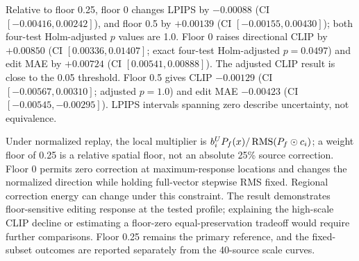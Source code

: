 Relative to floor 0.25, floor 0 changes LPIPS by $-0.00088$ (CI $[-0.00416,0.00242]$), and floor 0.5 by $+0.00139$ (CI $[-0.00155,0.00430]$); both four-test Holm-adjusted $p$ values are 1.0. Floor 0 raises directional CLIP by $+0.00850$ (CI $[0.00336,0.01407]$; exact four-test Holm-adjusted $p=0.0497$) and edit MAE by $+0.00724$ (CI $[0.00541,0.00888]$). The adjusted CLIP result is close to the 0.05 threshold. Floor 0.5 gives CLIP $-0.00129$ (CI $[-0.00567,0.00310]$; adjusted $p=1.0$) and edit MAE $-0.00423$ (CI $[-0.00545,-0.00295]$). LPIPS intervals spanning zero describe uncertainty, not equivalence.

Under normalized replay, the local multiplier is $b_i^U P_f(x)/\operatorname{RMS}(P_f\odot c_i)$; a weight floor of 0.25 is a relative spatial floor, not an absolute 25\% source correction. Floor 0 permits zero correction at maximum-response locations and changes the normalized direction while holding full-vector stepwise RMS fixed. Regional correction energy can change under this constraint. The result demonstrates floor-sensitive editing response at the tested profile; explaining the high-scale CLIP decline or estimating a floor-zero equal-preservation tradeoff would require further comparisons. Floor 0.25 remains the primary reference, and the fixed-subset outcomes are reported separately from the 40-source scale curves.
